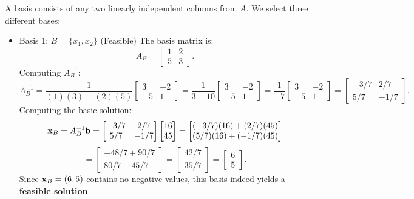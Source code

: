 A basis consists of any two linearly independent columns from \( A \). We select three different bases:
\begin{itemize}
\item  Basis 1: \(B= \{x_1, x_2\} \) (Feasible)
The basis matrix is:
\[
A_B =
\begin{bmatrix}
    1 & 2 \\
    5 & 3
\end{bmatrix}.
\]
Computing \( A_B^{-1} \):
\[
A_B^{-1} =
\frac{1}{(1)(3) - (2)(5)}
\begin{bmatrix}
    3 & -2 \\
    -5 & 1
\end{bmatrix}
=
\frac{1}{3 - 10}
\begin{bmatrix}
    3 & -2 \\
    -5 & 1
\end{bmatrix}
=
\frac{1}{-7}
\begin{bmatrix}
    3 & -2 \\
    -5 & 1
\end{bmatrix}
=
\begin{bmatrix}
    -3/7 & 2/7 \\
    5/7 & -1/7
\end{bmatrix}.
\]
Computing the basic solution:
\[
\mathbf{x}_B = A_B^{-1}\mathbf{b}=
\begin{bmatrix}
    -3/7 & 2/7 \\
    5/7 & -1/7
\end{bmatrix}
\begin{bmatrix}
    16 \\ 45
\end{bmatrix}
=
\begin{bmatrix}
    (-3/7)(16) + (2/7)(45) \\
    (5/7)(16) + (-1/7)(45)
\end{bmatrix}
\]
\[
=
\begin{bmatrix}
    -48/7 + 90/7 \\
    80/7 - 45/7
\end{bmatrix}
=
\begin{bmatrix}
    42/7 \\
    35/7
\end{bmatrix}
=
\begin{bmatrix}
    6 \\ 5
\end{bmatrix}.
\]
Since \( \mathbf{x}_B = (6,5) \) contains no negative values, this basis indeed yields a \textbf{feasible solution}.


\end{itemize}
